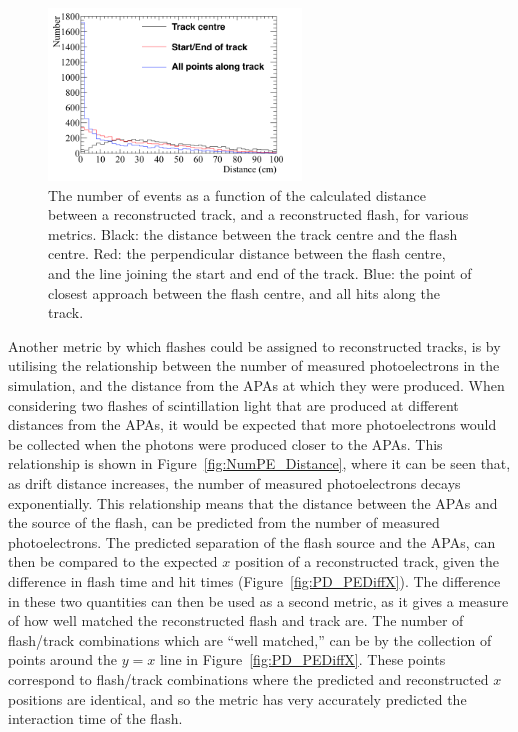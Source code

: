 \begin{figure}
  \centering
  \includegraphics[width=0.6\textwidth]{DiffTrackSeps}
  \caption[Matching tracks and flashes in the 35 ton using positions in the $yz$ plane]
          {The number of events as a function of the calculated distance between a reconstructed track, and a reconstructed flash, for various metrics. Black: the distance between the track centre and the flash centre. Red: the perpendicular distance between the flash centre, and the line joining the start and end of the track. Blue: the point of closest approach between the flash centre, and all hits along the track.}
  \label{fig:PDYZDist}
\end{figure}

Another metric by which flashes could be assigned to reconstructed tracks, is by utilising the relationship between the number of measured photoelectrons in the simulation, and the distance from the APAs at which they were produced. When considering two flashes of scintillation light that are produced at different distances from the APAs, it would be expected that more photoelectrons would be collected when the photons were produced closer to the APAs. This relationship is shown in Figure~\ref{fig:NumPE_Distance}, where it can be seen that, as drift distance increases, the number of measured photoelectrons decays exponentially. This relationship means that the distance between the APAs and the source of the flash, can be predicted from the number of measured photoelectrons. The predicted separation of the flash source and the APAs, can then be compared to the expected $x$ position of a reconstructed track, given the difference in flash time and hit times (Figure~\ref{fig:PD_PEDiffX}). The difference in these two quantities can then be used as a second metric, as it gives a measure of how well matched the reconstructed flash and track are. The number of flash/track combinations which are ``well matched,'' can be by the collection of points around the $y=x$ line in Figure~\ref{fig:PD_PEDiffX}. These points correspond to flash/track combinations where the predicted and reconstructed $x$ positions are identical, and so the metric has very accurately predicted the interaction time of the flash. \\

